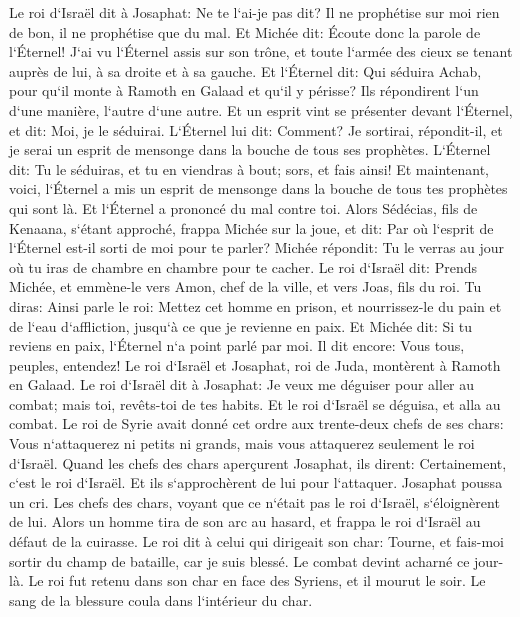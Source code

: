 \verse Le roi d`Israël dit à Josaphat: Ne te l`ai-je pas dit? Il ne prophétise sur moi rien de bon, il ne prophétise que du mal. 
\verse Et Michée dit: Écoute donc la parole de l`Éternel! J`ai vu l`Éternel assis sur son trône, et toute l`armée des cieux se tenant auprès de lui, à sa droite et à sa gauche. 
\verse Et l`Éternel dit: Qui séduira Achab, pour qu`il monte à Ramoth en Galaad et qu`il y périsse? Ils répondirent l`un d`une manière, l`autre d`une autre. 
\verse Et un esprit vint se présenter devant l`Éternel, et dit: Moi, je le séduirai. L`Éternel lui dit: Comment? 
\verse Je sortirai, répondit-il, et je serai un esprit de mensonge dans la bouche de tous ses prophètes. L`Éternel dit: Tu le séduiras, et tu en viendras à bout; sors, et fais ainsi! 
\verse Et maintenant, voici, l`Éternel a mis un esprit de mensonge dans la bouche de tous tes prophètes qui sont là. Et l`Éternel a prononcé du mal contre toi. 
\verse Alors Sédécias, fils de Kenaana, s`étant approché, frappa Michée sur la joue, et dit: Par où l`esprit de l`Éternel est-il sorti de moi pour te parler? 
\verse Michée répondit: Tu le verras au jour où tu iras de chambre en chambre pour te cacher. 
\verse Le roi d`Israël dit: Prends Michée, et emmène-le vers Amon, chef de la ville, et vers Joas, fils du roi. 
\verse Tu diras: Ainsi parle le roi: Mettez cet homme en prison, et nourrissez-le du pain et de l`eau d`affliction, jusqu`à ce que je revienne en paix. 
\verse Et Michée dit: Si tu reviens en paix, l`Éternel n`a point parlé par moi. Il dit encore: Vous tous, peuples, entendez! 
\verse Le roi d`Israël et Josaphat, roi de Juda, montèrent à Ramoth en Galaad. 
\verse Le roi d`Israël dit à Josaphat: Je veux me déguiser pour aller au combat; mais toi, revêts-toi de tes habits. Et le roi d`Israël se déguisa, et alla au combat. 
\verse Le roi de Syrie avait donné cet ordre aux trente-deux chefs de ses chars: Vous n`attaquerez ni petits ni grands, mais vous attaquerez seulement le roi d`Israël. 
\verse Quand les chefs des chars aperçurent Josaphat, ils dirent: Certainement, c`est le roi d`Israël. Et ils s`approchèrent de lui pour l`attaquer. Josaphat poussa un cri. 
\verse Les chefs des chars, voyant que ce n`était pas le roi d`Israël, s`éloignèrent de lui. 
\verse Alors un homme tira de son arc au hasard, et frappa le roi d`Israël au défaut de la cuirasse. Le roi dit à celui qui dirigeait son char: Tourne, et fais-moi sortir du champ de bataille, car je suis blessé. 
\verse Le combat devint acharné ce jour-là. Le roi fut retenu dans son char en face des Syriens, et il mourut le soir. Le sang de la blessure coula dans l`intérieur du char. 
